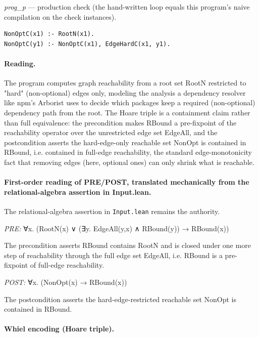 \documentclass[10pt]{article}
\begin{document}
{\raggedright\textit{prog\_p} --- production check (the hand-written loop equals this program's naive compilation on the check instances).\par}

\begin{Verbatim}[fontsize=\scriptsize,breaklines=true,breakanywhere=true,frame=single,framesep=1.5mm]
NonOptC(x1) :- RootN(x1).
NonOptC(y1) :- NonOptC(x1), EdgeHardC(x1, y1).
\end{Verbatim}

\paragraph{Reading.} The program computes graph reachability from a root set RootN restricted to "hard" (non-optional) edges only, modeling the analysis a dependency resolver like npm's Arborist uses to decide which packages keep a required (non-optional) dependency path from the root. The Hoare triple is a containment claim rather than full equivalence: the precondition makes RBound a pre-fixpoint of the reachability operator over the unrestricted edge set EdgeAll, and the postcondition asserts the hard-edge-only reachable set NonOpt is contained in RBound, i.e. contained in full-edge reachability, the standard edge-monotonicity fact that removing edges (here, optional ones) can only shrink what is reachable.

\paragraph{First-order reading of PRE/POST, translated mechanically from the relational-algebra assertion in Input.lean.} The relational-algebra assertion in \texttt{Input.lean} remains the authority.

\textit{PRE:} ∀x. (RootN(x) ∨ (∃y. EdgeAll(y,x) ∧ RBound(y)) → RBound(x))\par The precondition asserts RBound contains RootN and is closed under one more step of reachability through the full edge set EdgeAll, i.e. RBound is a pre-fixpoint of full-edge reachability.

\textit{POST:} ∀x. (NonOpt(x) → RBound(x))\par The postcondition asserts the hard-edge-restricted reachable set NonOpt is contained in RBound.

\paragraph{Whiel encoding (Hoare triple).}
\end{document}

